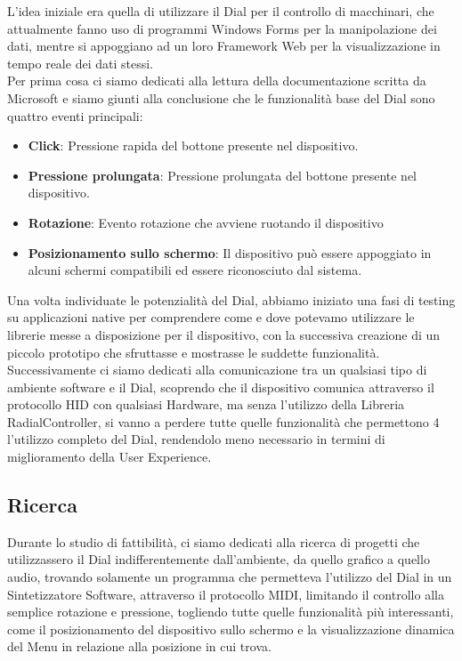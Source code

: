 L'idea iniziale era quella di utilizzare il Dial per il controllo di macchinari, che attualmente fanno uso di programmi Windows Forms per la manipolazione dei dati, mentre si appoggiano ad un loro Framework Web per la visualizzazione in tempo reale dei dati stessi.\\

Per prima cosa ci siamo dedicati alla lettura della documentazione scritta da Microsoft e siamo giunti alla conclusione che le funzionalità base del Dial sono quattro eventi principali:

\begin{itemize}
\item \textbf{Click}: Pressione rapida del bottone presente nel dispositivo.
\item \textbf{Pressione prolungata}: Pressione prolungata del bottone presente nel dispositivo.
\item \textbf{Rotazione}: Evento rotazione che avviene ruotando il dispositivo
\item \textbf{Posizionamento sullo schermo}: Il dispositivo può essere appoggiato in alcuni schermi compatibili ed essere riconosciuto dal sistema.
\end{itemize}

Una volta individuate le potenzialità del Dial, abbiamo iniziato una fasi di testing su applicazioni native per comprendere come e dove potevamo utilizzare le librerie messe a disposizione per il dispositivo, con la successiva creazione di un piccolo prototipo che sfruttasse e mostrasse le suddette funzionalità.\\

Successivamente ci siamo dedicati alla comunicazione tra un qualsiasi tipo di ambiente software e il Dial, scoprendo che il dispositivo comunica attraverso il protocollo HID con qualsiasi Hardware, ma senza l'utilizzo della Libreria RadialController, si vanno a perdere tutte quelle funzionalità che permettono 4 l'utilizzo completo del Dial, rendendolo meno necessario in termini di miglioramento della User Experience.
 
\newpage
\subsection{Ricerca}

Durante lo studio di fattibilità, ci siamo dedicati alla ricerca di progetti che utilizzassero il Dial indifferentemente dall’ambiente, da quello grafico a quello audio, trovando solamente un programma che permetteva l'utilizzo del Dial in un Sintetizzatore Software, attraverso il protocollo MIDI, limitando il controllo alla semplice rotazione e pressione, togliendo tutte quelle funzionalità più interessanti, come il posizionamento del dispositivo sullo schermo e la visualizzazione dinamica del Menu in relazione alla posizione in cui trova.\\


